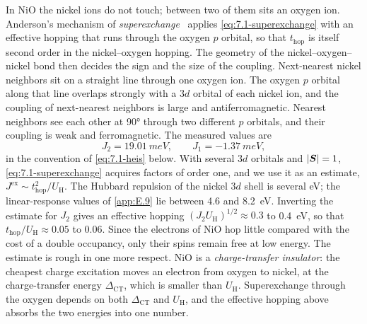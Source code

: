 In NiO the nickel ions do not touch; between two of them sits an oxygen ion. Anderson's mechanism of \emph{superexchange}~\cite{anderson1959new} applies \cref{eq:7.1-superexchange} with an effective hopping that runs through the oxygen $p$ orbital, so that $t_{\mathrm{hop}}$ is itself second order in the nickel--oxygen hopping. The geometry of the nickel--oxygen--nickel bond then decides the sign and the size of the coupling. Next-nearest nickel neighbors sit on a straight line through one oxygen ion. The oxygen $p$ orbital along that line overlaps strongly with a $3d$ orbital of each nickel ion, and the coupling of next-nearest neighbors is large and antiferromagnetic. Nearest neighbors see each other at \ang{90} through two different $p$ orbitals, and their coupling is weak and ferromagnetic. The measured values are~\cite{hutchings1972measurement}
\begin{equation}
  J_2 = \SI{19.01}{meV}, \qquad J_1 = -\SI{1.37}{meV} ,
  \label{eq:7.1-NiO}
\end{equation}
in the convention of \cref{eq:7.1-heis} below. With several $3d$ orbitals and $|\bm{S}| = 1$, \cref{eq:7.1-superexchange} acquires factors of order one, and we use it as an estimate, $J^{\mathrm{ex}} \sim t_{\mathrm{hop}}^2/U_{\mathrm{H}}$. The Hubbard repulsion of the nickel $3d$ shell is several eV; the linear-response values of \cref{app:E.9} lie between 4.6 and \SI{8.2}{eV}. Inverting the estimate for $J_2$ gives an effective hopping $(J_2U_{\mathrm{H}})^{1/2} \approx 0.3$ to \SI{0.4}{eV}, so that $t_{\mathrm{hop}}/U_{\mathrm{H}} \approx 0.05$ to 0.06. Since the electrons of NiO hop little compared with the cost of a double occupancy, only their spins remain free at low energy. The estimate is rough in one more respect. NiO is a \emph{charge-transfer insulator}: the cheapest charge excitation moves an electron from oxygen to nickel, at the charge-transfer energy $\Delta_{\mathrm{CT}}$, which is smaller than $U_{\mathrm{H}}$. Superexchange through the oxygen depends on both $\Delta_{\mathrm{CT}}$ and $U_{\mathrm{H}}$, and the effective hopping above absorbs the two energies into one number.

